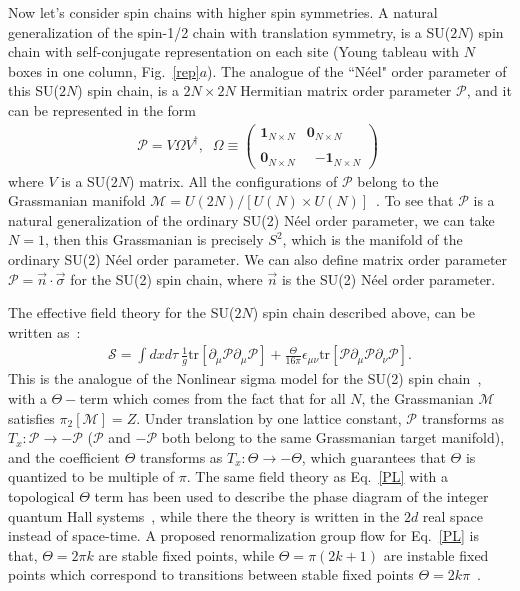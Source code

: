 \documentclass[aps,prb,twocolumn,superscriptaddress,showpacs]{revtex4}
\newcommand{\beqn}{\begin{eqnarray}}
\newcommand{\eeqn}{\end{eqnarray}}
\begin{document}
Now let's consider spin chains with higher spin symmetries. A
natural generalization of the spin-1/2 chain with translation
symmetry, is a SU($2N$) spin chain with self-conjugate
representation on each site (Young tableau with $N$ boxes in one
column, Fig.~\ref{rep}$a$). The analogue of the ``N\'{e}el" order
parameter of this SU($2N$) spin chain, is a $2N \times 2N$
Hermitian matrix order parameter $\mathcal{P}$, and it can be
represented in the form \beqn \mathcal{P} = V \Omega V^\dagger,
\;\;\Omega \equiv\! \left(
\begin{array}{cccc}
\mathbf{1}_{N \times N} & \mathbf{0}_{ N \times N} \\ \\
\mathbf{0}_{N \times N} & \;\;\mathbf{-1}_{N \times N}
\end{array}
\right) \;\label{P}\eeqn where $V$ is a SU($2N$) matrix. All the
configurations of $\mathcal{P}$ belong to the Grassmanian manifold
$\mathcal{M} = U(2N)/[U(N) \times
U(N)]$~\cite{affleck,sachdevread}. To see that $\mathcal{P}$ is a
natural generalization of the ordinary SU(2) N\'{e}el order
parameter, we can take $N=1$, then this Grassmanian is precisely
$S^2$, which is the manifold of the ordinary SU(2) N\'{e}el order
parameter. We can also define matrix order parameter $\mathcal{P}
= \vec{n}\cdot \vec{\sigma}$ for the SU(2) spin chain, where
$\vec{n}$ is the SU(2) N\'{e}el order parameter.

The effective field theory for the SU($2N$) spin chain described
above, can be written as~\cite{affleck}: \beqn \mathcal{S} = \int
dx d\tau \ \frac{1}{g} \mathrm{tr}[\partial_\mu \mathcal{P}
\partial_\mu \mathcal{P}] + \frac{\Theta}{16 \pi}
\epsilon_{\mu\nu} \mathrm{ tr}[ \mathcal{P}
\partial_\mu \mathcal{P} \partial_\nu \mathcal{P} ]. \label{PL}\eeqn This is
the analogue of the Nonlinear sigma model for the SU(2) spin
chain~\cite{Haldane1,Haldane2}, with a $\Theta-$term which comes
from the fact that for all $N$, the Grassmanian $\mathcal{M}$
satisfies $\pi_2[\mathcal{M}] = Z$. Under translation by one
lattice constant, $\mathcal{P}$ transforms as $T_x: \mathcal{P}
\rightarrow - \mathcal{P}$ ($\mathcal{P}$ and $- \mathcal{P}$ both
belong to the same Grassmanian target manifold), and the
coefficient $\Theta$ transforms as $T_x: \Theta \rightarrow -
\Theta$, which guarantees that $\Theta$ is quantized to be
multiple of $\pi$. The same field theory as Eq.~\ref{PL} with a
topological $\Theta$ term has been used to describe the phase
diagram of the integer quantum Hall
systems~\cite{pruisken1,pruisken2,pruisken2011}, while there the
theory is written in the $2d$ real space instead of space-time. A
proposed renormalization group flow for Eq.~\ref{PL} is that,
$\Theta  = 2\pi k$ are stable fixed points, while $\Theta = \pi
(2k+1)$ are instable fixed points which correspond to transitions
between stable fixed points $\Theta = 2k \pi$~\cite{affleck}.
\end{document}
